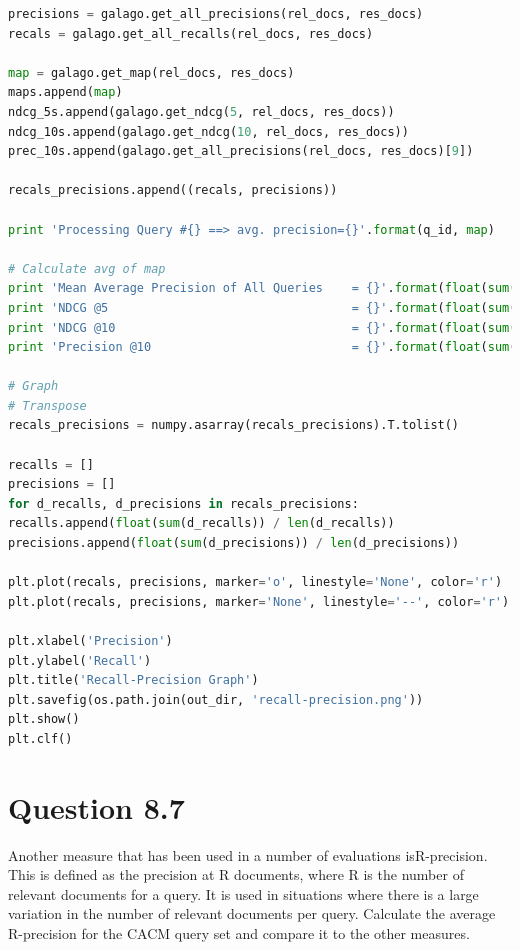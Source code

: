 \documentclass[letterpaper,11pt]{article}
\begin{document}
\begin{lstlisting}[language=python, caption={Code for question 8.5}, label={lst:85}]
precisions = galago.get_all_precisions(rel_docs, res_docs)
recals = galago.get_all_recalls(rel_docs, res_docs)

map = galago.get_map(rel_docs, res_docs)
maps.append(map)
ndcg_5s.append(galago.get_ndcg(5, rel_docs, res_docs))
ndcg_10s.append(galago.get_ndcg(10, rel_docs, res_docs))
prec_10s.append(galago.get_all_precisions(rel_docs, res_docs)[9])

recals_precisions.append((recals, precisions))

print 'Processing Query #{} ==> avg. precision={}'.format(q_id, map)

# Calculate avg of map
print 'Mean Average Precision of All Queries    = {}'.format(float(sum(maps)) / len(maps))
print 'NDCG @5                                  = {}'.format(float(sum(ndcg_5s)) / len(ndcg_5s))
print 'NDCG @10                                 = {}'.format(float(sum(ndcg_10s)) / len(ndcg_10s))
print 'Precision @10                            = {}'.format(float(sum(prec_10s)) / len(prec_10s))

# Graph
# Transpose
recals_precisions = numpy.asarray(recals_precisions).T.tolist()

recalls = []
precisions = []
for d_recalls, d_precisions in recals_precisions:
recalls.append(float(sum(d_recalls)) / len(d_recalls))
precisions.append(float(sum(d_precisions)) / len(d_precisions))

plt.plot(recals, precisions, marker='o', linestyle='None', color='r')
plt.plot(recals, precisions, marker='None', linestyle='--', color='r')

plt.xlabel('Precision')
plt.ylabel('Recall')
plt.title('Recall-Precision Graph')
plt.savefig(os.path.join(out_dir, 'recall-precision.png'))
plt.show()
plt.clf()


\end{lstlisting}



\noindent\makebox[\linewidth]{\rule{\textwidth}{0.4pt}}

\section*{Question 8.7}
\begin{spverbatim}
Another measure that has been used in a number of evaluations isR-precision.
This is defined as the precision at R documents, where R is the number of relevant
documents for a query. It is used in situations where there is a large variation in
the number of relevant documents per query. Calculate the average R-precision
for the CACM query set and compare it to the other measures.
\end{spverbatim}
\end{document}
